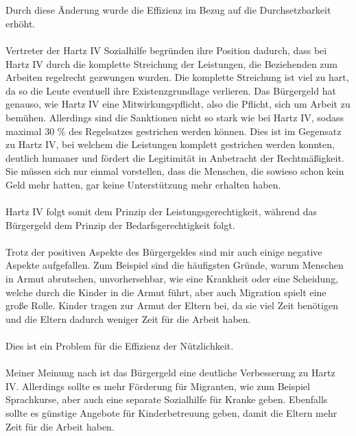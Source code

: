 \documentclass[11pt,a4paper]{article}
\begin{document}
    \\\\
    Durch diese Änderung wurde die Effizienz im Bezug auf die Durchsetzbarkeit erhöht.
    \\\\
    Vertreter der Hartz IV Sozialhilfe begründen ihre Position dadurch, dass bei Hartz IV durch die komplette Streichung der Leistungen, die Beziehenden zum Arbeiten regelrecht gezwungen wurden.
    Die komplette Streichung ist viel zu hart, da so die Leute eventuell ihre Existenzgrundlage verlieren.
    Das Bürgergeld hat genauso, wie Hartz IV eine Mitwirkungspflicht, also die Pflicht, sich um Arbeit zu bemühen.
    Allerdings sind die Sanktionen nicht so stark wie bei Hartz IV, sodass maximal 30 \% des Regelsatzes gestrichen werden können.
    Dies ist im Gegensatz zu Hartz IV, bei welchem die Leistungen komplett gestrichen werden konnten, deutlich humaner und fördert die Legitimität in Anbetracht der Rechtmäßigkeit.
    Sie müssen sich nur einmal vorstellen, dass die Menschen, die sowieso schon kein Geld mehr hatten, gar keine Unterstützung mehr erhalten haben.
    \\\\
    Hartz IV folgt somit dem Prinzip der Leistungsgerechtigkeit, während das Bürgergeld dem Prinzip der Bedarfsgerechtigkeit folgt.
    \\\\
    Trotz der positiven Aspekte des Bürgergeldes sind mir auch einige negative Aspekte aufgefallen.
    Zum Beispiel sind die häufigsten Gründe, warum Menschen in Armut abrutschen, unvorhersehbar, wie eine Krankheit oder eine Scheidung, welche durch die Kinder in die Armut führt, aber auch Migration spielt eine große Rolle.
    Kinder tragen zur Armut der Eltern bei, da sie viel Zeit benötigen und die Eltern dadurch weniger Zeit für die Arbeit haben.
    \\\\
    Dies ist ein Problem für die Effizienz der Nützlichkeit.
    \\\\
    Meiner Meinung nach ist das Bürgergeld eine deutliche Verbesserung zu Hartz IV.
    Allerdings sollte es mehr Förderung für Migranten, wie zum Beispiel Sprachkurse, aber auch eine separate Sozialhilfe für Kranke geben.
    Ebenfalls sollte es günstige Angebote für Kinderbetreuung geben, damit die Eltern mehr Zeit für die Arbeit haben.
\end{document}
